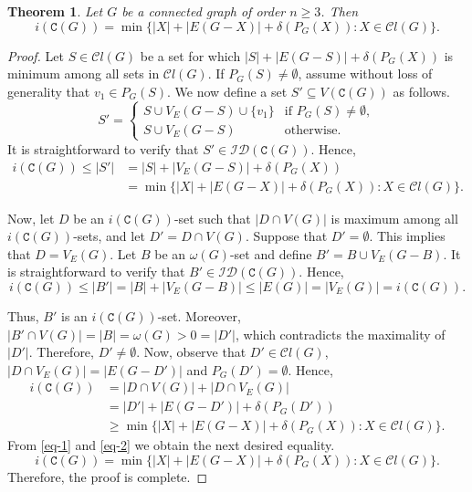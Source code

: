 \documentclass[12pt]{article}
\newtheorem{theorem}[remark]{Theorem}
\begin{document}
\begin{theorem}\label{theo-i-C(G)}
Let $G$ be a connected graph of order $n\geq 3$. Then
$$i (\mathtt{C}(G)) = \min \{ |X| + |E(G-X)| + \delta(P_{G}(X)): X\in \mathcal{C}l(G)\}.$$
\end{theorem}
	
\begin{proof}
Let $S\in \mathcal{C}l(G)$ be a set for which $|S| + |E(G-S)| + \delta(P_{G}(X))$ is minimum among all sets in $\mathcal{C}l(G)$. If $P_{G}(S)\neq \emptyset$, assume without loss of generality that $v_1\in P_{G}(S)$. We now define a set $S'\subseteq V(\mathtt{C}(G))$ as follows.
$$S' = 
\begin{cases}
S \cup V_E(G-S) \cup \{v_1\} & \text{if } P_{G}(S) \neq \emptyset, \\[4pt]
S \cup V_E(G-S) & \text{otherwise.}
\end{cases}$$
It is straightforward to verify that $S'\in \mathcal{ID}(\mathtt{C}(G))$. Hence, 
\begin{equation}\label{eq-1}
\begin{split}
i(\mathtt{C}(G)) \leq |S'|&=|S|+ |V_E(G-S)| + \delta(P_{G}(X)) \\[4pt]
&= \min \{ |X| + |E(G-X)| + \delta(P_{G}(X)): X\in \mathcal{C}l(G)\}.
\end{split}
\end{equation}

\noindent
Now, let $D$ be an $i(\mathtt{C}(G))$-set such that $|D\cap V(G)|$ is maximum among all $i(\mathtt{C}(G))$-sets, and let $D'=D\cap V(G)$. Suppose that $D'=\emptyset$. This implies that $D=V_E(G)$. Let $B$ be an $\omega(G)$-set and define $B'=B\cup V_E(G-B)$. It is straightforward to verify that $B'\in \mathcal{ID}(\mathtt{C}(G))$. Hence, 
\begin{equation*}
i(\mathtt{C}(G))\leq |B'|=|B|+|V_E(G-B)|\leq |E(G)|=|V_E(G)|=i(\mathtt{C}(G)).
\end{equation*}

\noindent
Thus, $B'$ is an $i(\mathtt{C}(G))$-set. Moreover, $|B'\cap V(G)|=|B|=\omega(G)>0=|D'|$, which contradicts the maximality of $|D'|$. Therefore, $D'\neq \emptyset$.
Now, observe that $D'\in \mathcal{C}l(G)$, $|D\cap V_E(G)| = |E(G-D')|$ and $P_{G}(D')=\emptyset$. Hence, 
\begin{equation}\label{eq-2}
\begin{split}
i(\mathtt{C}(G)) &= |D\cap V(G)| + |D\cap V_E(G)| \\[3pt]
&= |D'| + |E(G-D')| + \delta(P_{G}(D')) \\[3pt]
&\geq \min \{ |X| + |E(G-X)| + \delta(P_{G}(X)): X\in \mathcal{C}l(G)\}.
\end{split}
\end{equation}
From \eqref{eq-1} and \eqref{eq-2} we obtain the next desired equality.
$$i (\mathtt{C}(G)) = \min \{ |X| + |E(G-X)| + \delta(P_{G}(X)): X\in \mathcal{C}l(G)\}.$$
Therefore, the proof is complete.
\end{proof}
\end{document}
